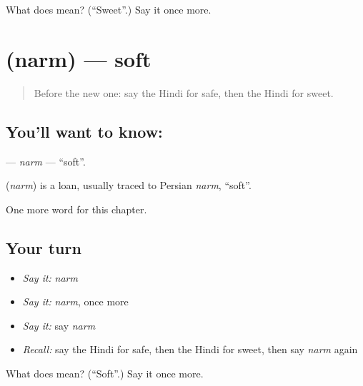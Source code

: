 \begin{tcolorbox}[breakable,colback=teal!4,colframe=teal!35!black,title={Before you move on}]
What does  mean? (\textquotedblleft{}Sweet\textquotedblright{}.) Say it once more.
\end{tcolorbox}
\section[\texorpdfstring{\hi{नर्म} (narm)}{नर्म (narm)}]{ (narm) — soft}

\label{lesson:HI-C213-narm}



\begin{quote}
Before the new one: say the Hindi for safe, then the Hindi for sweet.
\end{quote}

\subsection*{You'll want to know: }
\textbf{} — \emph{narm} — \textquotedblleft{}soft\textquotedblright{}.

\begin{cousinweb}
\textbf{} (\emph{narm}) is a loan, usually traced to Persian \emph{narm}, \textquotedblleft{}soft\textquotedblright{}.
\end{cousinweb}

\begin{grammarlens}[title={What you've built}]
One more word for this chapter.
\end{grammarlens}

\subsection*{Your turn}
\begin{itemize}
\raggedright
  \item \emph{Say it:} \emph{narm}
  \item \emph{Say it:} \emph{narm}, once more
  \item \emph{Say it:} say \emph{narm}
  \item \emph{Recall:} say the Hindi for safe, then the Hindi for sweet, then say \emph{narm} again
\end{itemize}

\begin{tcolorbox}[breakable,colback=teal!4,colframe=teal!35!black,title={Before you move on}]
What does  mean? (\textquotedblleft{}Soft\textquotedblright{}.) Say it once more.
\end{tcolorbox}
